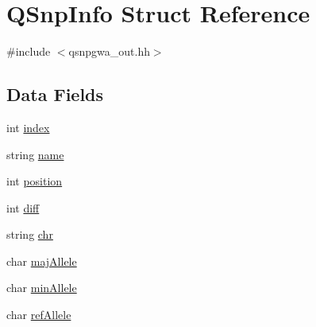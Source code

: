 \hypertarget{structQSnpInfo}{
\section{QSnpInfo Struct Reference}
\label{structQSnpInfo}
}


{\ttfamily \#include $<$qsnpgwa\_\-out.hh$>$}

\subsection*{Data Fields}
\begin{DoxyCompactItemize}
\item 
int \hyperlink{structQSnpInfo_a9e7d70d97a7d4969e8f5526a211dc035}{index}
\item 
string \hyperlink{structQSnpInfo_a5c52643a7fd95d1ea89735a57ff68771}{name}
\item 
int \hyperlink{structQSnpInfo_a71189167084540664f90f7cfb349253c}{position}
\item 
int \hyperlink{structQSnpInfo_ad8242d70e36d9d53e25f1067d17bbc7f}{diff}
\item 
string \hyperlink{structQSnpInfo_a68ec4f4ab2226af12bc8c3b686111e06}{chr}
\item 
char \hyperlink{structQSnpInfo_ae77d5a79420058b1ecbf1c1f685060ec}{majAllele}
\item 
char \hyperlink{structQSnpInfo_a6f34c105872120fe8150db3c6bb6264e}{minAllele}
\item 
char \hyperlink{structQSnpInfo_aaba3afdbc3fb7b400c84e942ccc30dc6}{refAllele}
\end{DoxyCompactItemize}


